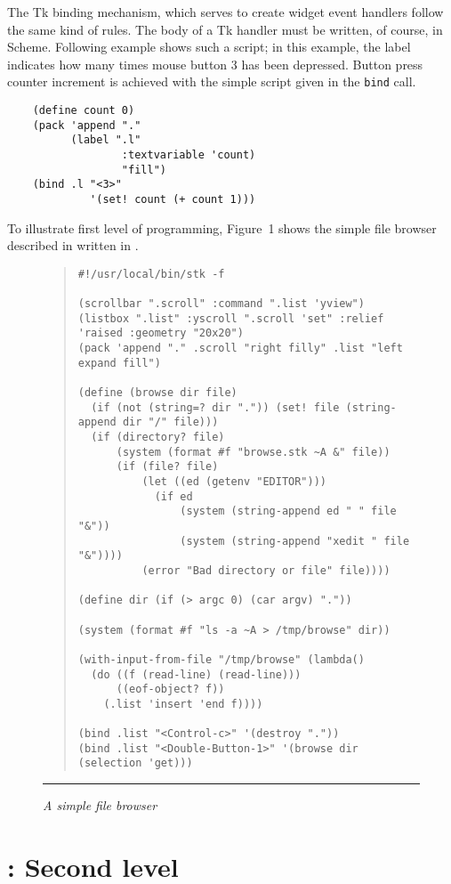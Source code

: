 The Tk binding mechanism, which serves to create widget event handlers follow
the same kind of rules. The body of a Tk handler must be written, of
course, in Scheme. Following example shows such a script; in this example, the
label indicates how many times mouse button 3 has been depressed.
Button press counter increment is achieved with the simple script
given in the {\tt bind} call.
{\small
\begin{verbatim}
    (define count 0)
    (pack 'append "." 
          (label ".l" 
                  :textvariable 'count) 
                  "fill")
    (bind .l "<3>" 
             '(set! count (+ count 1)))
\end{verbatim}
}

To illustrate {\stk} first level of programming, Figure~1 shows the simple
file browser described in {\cite{Ouster-Tcl}} written in {\stk}.

\begin{figure*}[t]
{\small
\vskip2mm
\begin{quote}
\begin{verbatim}
#!/usr/local/bin/stk -f

(scrollbar ".scroll" :command ".list 'yview")
(listbox ".list" :yscroll ".scroll 'set" :relief 'raised :geometry "20x20")
(pack 'append "." .scroll "right filly" .list "left expand fill")

(define (browse dir file)
  (if (not (string=? dir ".")) (set! file (string-append dir "/" file)))
  (if (directory? file)
      (system (format #f "browse.stk ~A &" file))
      (if (file? file)
          (let ((ed (getenv "EDITOR")))
            (if ed
                (system (string-append ed " " file "&"))
                (system (string-append "xedit " file "&"))))
          (error "Bad directory or file" file))))

(define dir (if (> argc 0) (car argv) "."))

(system (format #f "ls -a ~A > /tmp/browse" dir))

(with-input-from-file "/tmp/browse" (lambda()
  (do ((f (read-line) (read-line)))
      ((eof-object? f))
    (.list 'insert 'end f))))

(bind .list "<Control-c>" '(destroy "."))
(bind .list "<Double-Button-1>" '(browse dir (selection 'get)))
\end{verbatim}
\end{quote}
}
\caption{\em A simple file browser}
\vskip2mm
\hrule
\end{figure*}

\section{\stk: Second level}

